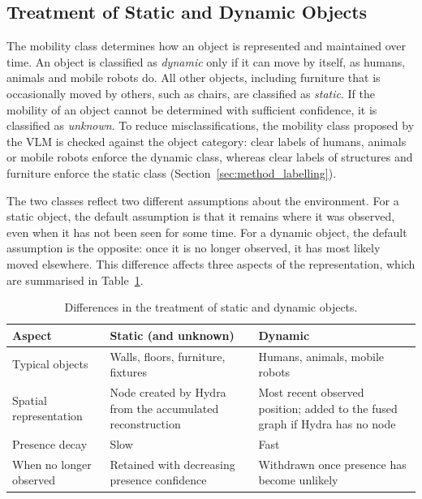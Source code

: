 \subsection{Treatment of Static and Dynamic Objects}
\label{subsec:method_static_dynamic}

{\small

The mobility class determines how an object is represented and maintained over time. An object is classified as \textit{dynamic} only if it can move by itself, as humans, animals and mobile robots do. All other objects, including furniture that is occasionally moved by others, such as chairs, are classified as \textit{static}. If the mobility of an object cannot be determined with sufficient confidence, it is classified as \textit{unknown}. To reduce misclassifications, the mobility class proposed by the VLM is checked against the object category: clear labels of humans, animals or mobile robots enforce the dynamic class, whereas clear labels of structures and furniture enforce the static class (Section~\ref{sec:method_labelling}).

The two classes reflect two different assumptions about the environment. For a static object, the default assumption is that it remains where it was observed, even when it has not been seen for some time. For a dynamic object, the default assumption is the opposite: once it is no longer observed, it has most likely moved elsewhere. This difference affects three aspects of the representation, which are summarised in Table~\ref{tab:static_dynamic}.

\begin{table}[htbp]
\centering
\small
\caption{Differences in the treatment of static and dynamic objects.}
\label{tab:static_dynamic}
\begin{tabular}{p{}p{}p{}}
\hline
\textbf{Aspect} & \textbf{Static (and unknown)} & \textbf{Dynamic} \\
\hline
Typical objects & Walls, floors, furniture, fixtures & Humans, animals, mobile robots \\
Spatial representation & Node created by Hydra from the accumulated reconstruction & Most recent observed position; added to the fused graph if Hydra has no node \\
Presence decay & Slow & Fast \\
When no longer observed & Retained with decreasing presence confidence & Withdrawn once presence has become unlikely \\
\hline
\end{tabular}
\end{table}

}

